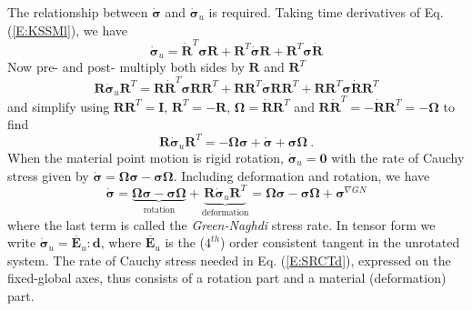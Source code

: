 \documentclass[11pt]{report}
\numberwithin{equation}{section}
\newcommand{\bmf } {\boldsymbol }  %
\newcommand{\ti}{\emph}
\newcommand{\nid}{\noindent}
\newcommand{\dotR} {\dot{\mathbf{R}}}
\begin{document}
The relationship between $\dot{\bmf{\sigma}}$ and $\dot{\bmf{\sigma}}_u$ is required.  Taking
time derivatives of Eq. (\ref{E:KSSMl}), we have
%
\begin{equation}\label{E:SRCTe}
\dot {\bmf{\sigma}}_u = \dotR^T \bmf{\sigma}\mathbf{R} + \mathbf{R}^T\dot{\bmf{\sigma}}\mathbf{R} +
\mathbf{R}^T\bmf{\sigma}\dotR
\end{equation}
%
\nid Now pre- and post- multiply both sides by $\mathbf{R}$ and $\mathbf{R}^T$
%
\begin{equation}\label{E:SRCTf}
\mathbf{R}\dot {\bmf{\sigma}}_u \mathbf{R}^T= \mathbf{R}\dotR^T \bmf{\sigma}\mathbf{R}\mathbf{R}^T +\mathbf{R} \mathbf{R}^T\dot{\bmf{\sigma}}\mathbf{R} \mathbf{R}^T+
\mathbf{R}\mathbf{R}^T\bmf{\sigma}\dotR\mathbf{R}^T
\end{equation}
\nid and simplify using $\mathbf{R}\mathbf{R}^T=\mathbf{I}$, $\mathbf{R}^T=-\mathbf{R}$, 
$\mathbf{\Omega}=\dotR\mathbf{R}^T$ and $\mathbf{R}\dotR^T=
-\dotR\mathbf{R}^T =-\mathbf{\Omega}$ to find
%
\begin{equation}\label{E:SRCTg}
\mathbf{R}\dot {\bmf{\sigma}}_u \mathbf{R}^T= -\mathbf{\Omega}\bmf{\sigma} +\dot{\bmf{\sigma}}+
\bmf{\sigma}\mathbf{\Omega}\ .
\end{equation}
\nid When the material point motion is rigid rotation, $\dot {\bmf{\sigma}}_u =\mathbf{0}$ with the
rate of Cauchy stress given by  $\dot{\bmf{\sigma}}=\mathbf{\Omega}\bmf{\sigma} -
\bmf{\sigma}\mathbf{\Omega}$. Including deformation and rotation,  we have
%
\begin{equation}\label{E:SRCTh}
\dot{\bmf{\sigma}}=\underbrace{\mathbf{\Omega}\bmf{\sigma} -
	\bmf{\sigma}\mathbf{\Omega}}_{\text{rotation}} +
	\underbrace{\mathbf{R}\dot {\bmf{\sigma}}_u \mathbf{R}^T}_{\text{deformation}}
	=\mathbf{\Omega}\bmf{\sigma} -
	\bmf{\sigma}\mathbf{\Omega} +\bmf{\sigma}^{\nabla GN}
\end{equation}
%
\nid where the last term  is called the \ti{Green-Naghdi} stress rate. In tensor form we write
$\dot {\bmf{\sigma}}_u= \overline{\mathbf{E}}_u:\mathbf{d}$, where 
$\overline{\mathbf{E}}_u$ is the ($4^{th}$)
order consistent tangent in the
unrotated system. The rate of Cauchy stress needed in Eq. (\ref{E:SRCTd}),
expressed on the fixed-global axes, thus consists of a
rotation part and a material (deformation) part. 
\end{document}
